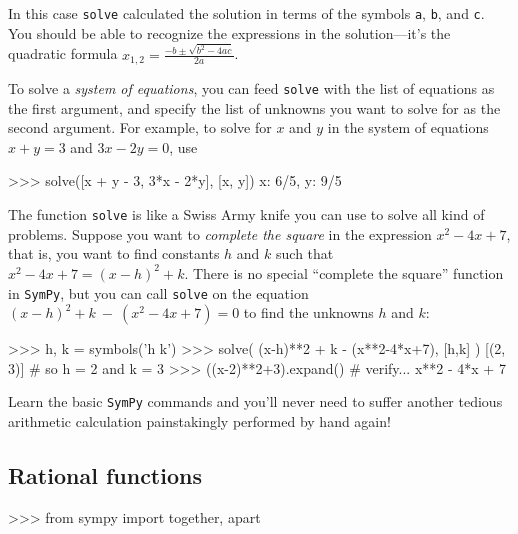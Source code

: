\noindent
In this case \texttt{solve} calculated the solution in terms of the symbols \texttt{a}, \texttt{b}, and \texttt{c}.
You should be able to recognize the expressions in the solution---it's the quadratic formula $x_{1,2} = \frac{-b \pm \sqrt{b^2 - 4ac}}{2a}$.



\bigskip

\noindent
To solve a \emph{system of equations},
you can feed \texttt{solve} with the list of equations as the first argument, and specify the list of unknowns you want to solve for as the second argument.
For example, to solve for $x$ and $y$ in the system of equations $x+y=3$ and $3x-2y=0$, use

\small
\begin{verbatimtab}
>>> solve([x + y - 3, 3*x - 2*y], [x, y])
{x: 6/5, y: 9/5}
\end{verbatimtab}
\normalsize

\bigskip

\noindent
The function \texttt{solve} is like a Swiss Army knife you can use to solve all kind of problems.
Suppose you want to \emph{complete the square} in the expression $x^2-4x+7$,								
that is, you want to find constants $h$ and $k$ such that $x^2-4x+7 = (x-h)^2 +k$.
There is no special ``complete the square'' function in \texttt{SymPy},
but you can call \texttt{solve} on the equation $(x-h)^2 +k \ - \  (x^2-4x+7) = 0$
to find the unknowns $h$ and $k$:

\small
\begin{verbatimtab}
>>> h, k = symbols('h k')
>>> solve( (x-h)**2 + k  - (x**2-4*x+7), [h,k] )
[(2, 3)]                               # so h = 2 and k = 3
>>> ((x-2)**2+3).expand()              # verify...
x**2 - 4*x + 7
\end{verbatimtab}
\normalsize

\noindent
Learn the basic \texttt{SymPy} commands 
and you'll never need to suffer another tedious arithmetic calculation painstakingly performed by hand again!



\subsection{Rational functions}
\label{basics:rational_functions}

\small
\begin{verbatimtab}
>>> from sympy import together, apart
\end{verbatimtab}
\normalsize

